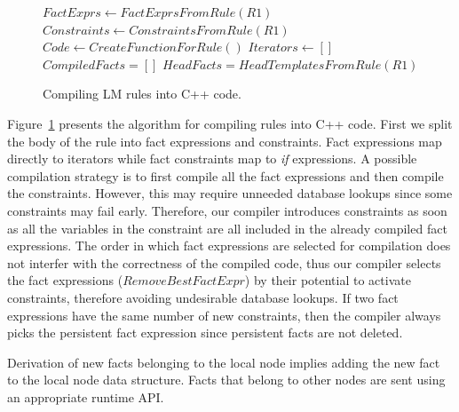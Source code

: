 \begin{figure}
\begin{algorithm}[H]
 $FactExprs \longleftarrow FactExprsFromRule(R1)$\;
 $Constraints \longleftarrow ConstraintsFromRule(R1)$\;
 $Code \longleftarrow CreateFunctionForRule()$\;
 $Iterators \longleftarrow []$\;
 $CompiledFacts = []$\;
 $HeadFacts = HeadTemplatesFromRule(R1)$\;
\end{algorithm}
 \caption{Compiling LM rules into C++ code.}
 \label{alg:compile_rule}
\end{figure}

Figure~\ref{alg:compile_rule} presents the algorithm for compiling rules into
C++ code.  First we split the body of the rule into fact expressions and
constraints. Fact expressions map directly to iterators while fact constraints
map to \emph{if} expressions. A possible compilation strategy is to first
compile all the fact expressions and then compile the constraints. However, this
may require unneeded database lookups since some constraints may fail early.
Therefore, our compiler introduces constraints as soon as all the variables in
the constraint are all included in the already compiled fact expressions. The
order in which fact expressions are selected for compilation does not interfer
with the correctness of the compiled code, thus our compiler selects the fact
expressions ($RemoveBestFactExpr$) by their potential to activate constraints,
therefore avoiding undesirable database lookups. If two fact
expressions have the same number of new constraints, then the
compiler always picks the persistent fact expression since
persistent facts are not deleted.

Derivation of new facts belonging to the local node implies adding the new fact
to the local node data structure. Facts that belong to other nodes are sent
using an appropriate runtime API.

